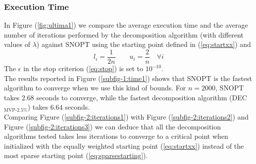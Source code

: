 \subsubsection{Execution Time}
In Figure (\ref{fig:ultima1}) we compare the average execution time and the average number of iterations performed by the decomposition algorithm (with different values of $\lambda$) against SNOPT using the starting point defined in (\ref{eq:startxx}) and 
\begin{equation}\label{eq:generalbox}
l_i = \frac{1}{2n}  \qquad u_i = \frac{2}{n}  \quad \forall i
\end{equation} 
The $\epsilon$ in the stop criterion (\ref{eq:stop}) is set to $10^{-10}$.\\ The results reported in Figure (\ref{subfig-1:time1}) shows that SNOPT is the fastest algorithm to converge when we use this kind of bounds. For $n=2000$, SNOPT takes $2.68$ seconds to converge, while the fastest decomposition algorithm (DEC$_{\text{MVP-}2.5\%}$) takes $6.64$ seconds.\\
Comparing Figure (\ref{subfig-2:iterations1}) with Figure (\ref{subfig-2:iterations2}) and Figure (\ref{subfig-2:iterations3}) we can deduce that all the decomposition algorithms tested takes less iterations to converge to a critical point when initialized with the equally weighted starting point (\ref{eq:startxx}) instead of the most sparse starting point (\ref{eq:sparsestarting}).
